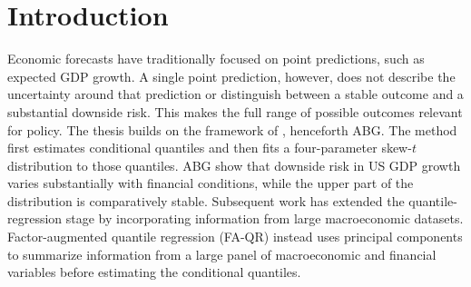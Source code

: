 \documentclass[12pt]{report} %
\begin{document}
\vspace*{\fill}

\newpage %
\thispagestyle{empty}
\mbox{}



\tableofcontents
\thispagestyle{fancy}

\newpage %
\thispagestyle{empty}
\mbox{}

\listoffigures
\thispagestyle{fancy}

\newpage %
\thispagestyle{empty}
\mbox{}

\listoftables
\thispagestyle{fancy}

\newpage %
\thispagestyle{empty}
\mbox{}


\clearpage
{} %



\chapter{Introduction}
\label{ch:intro}

Economic forecasts have traditionally focused on point predictions, such as expected GDP growth. A single point prediction, however, does not describe the uncertainty around that prediction or distinguish between a stable outcome and a substantial downside risk. This makes the full range of possible outcomes relevant for policy. The thesis builds on the framework of \textcite{adrian2019vulnerable}, henceforth ABG. The method first estimates conditional quantiles and then fits a four-parameter skew-$t$ distribution to those quantiles. ABG show that downside risk in US GDP growth varies substantially with financial conditions, while the upper part of the distribution is comparatively stable. Subsequent work has extended the quantile-regression stage by incorporating information from large macroeconomic datasets. Factor-augmented quantile regression (FA-QR) instead uses principal components to summarize information from a large panel of macroeconomic and financial variables before estimating the conditional quantiles.
\end{document}
